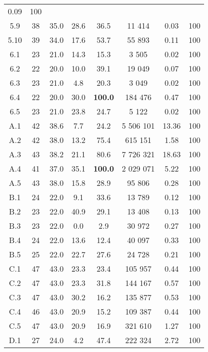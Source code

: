 \begin{longtable}{@{\extracolsep{5pt}}cccccccc}
	0.09
	&
	100
	\\
	5.9
	&
	38
	&
	35.0
	&
	28.6
	&
	36.5
	&
	11 414
	&
	0.03
	&
	100
	\\
	5.10
	&
	39
	&
	34.0
	&
	17.6
	&
	53.7
	&
	55 893
	&
	0.11
	&
	100
	\\
	6.1
	&
	23
	&
	21.0
	&
	14.3
	&
	15.3
	&
	3 505
	&
	0.02
	&
	100
	\\
	6.2
	&
	22
	&
	20.0
	&
	10.0
	&
	39.1
	&
	19 049
	&
	0.07
	&
	100
	\\
	6.3
	&
	23
	&
	21.0
	&
	4.8
	&
	20.3
	&
	3 049
	&
	0.02
	&
	100
	\\
	6.4
	&
	22
	&
	20.0
	&
	30.0
	&
	\textbf{100.0}
	&
	184 476
	&
	0.47
	&
	100
	\\
	6.5
	&
	23
	&
	21.0
	&
	23.8
	&
	24.7
	&
	5 122
	&
	0.02
	&
	100
	\\
	A.1
	&
	42
	&
	38.6
	&
	7.7
	&
	24.2
	&
	5 506 101
	&
	13.36
	&
	100
	\\
	A.2
	&
	42
	&
	38.0
	&
	13.2
	&
	75.4
	&
	615 151
	&
	1.58
	&
	100
	\\
	A.3
	&
	43
	&
	38.2
	&
	21.1
	&
	80.6
	&
	7 726 321
	&
	18.63
	&
	100
	\\
	A.4
	&
	41
	&
	37.0
	&
	35.1
	&
	\textbf{100.0}
	&
	2 029 071
	&
	5.22
	&
	100
	\\
	A.5
	&
	43
	&
	38.0
	&
	15.8
	&
	28.9
	&
	95 806
	&
	0.28
	&
	100
	\\
	B.1
	&
	24
	&
	22.0
	&
	9.1
	&
	33.6
	&
	13 789
	&
	0.12
	&
	100
	\\
	B.2
	&
	23
	&
	22.0
	&
	40.9
	&
	29.1
	&
	13 408
	&
	0.13
	&
	100
	\\
	B.3
	&
	23
	&
	22.0
	&
	0.0
	&
	2.9
	&
	30 972
	&
	0.27
	&
	100
	\\
	B.4
	&
	24
	&
	22.0
	&
	13.6
	&
	12.4
	&
	40 097
	&
	0.33
	&
	100
	\\
	B.5
	&
	25
	&
	22.0
	&
	22.7
	&
	27.6
	&
	24 728
	&
	0.21
	&
	100
	\\
	C.1
	&
	47
	&
	43.0
	&
	23.3
	&
	23.4
	&
	105 957
	&
	0.44
	&
	100
	\\
	C.2
	&
	47
	&
	43.0
	&
	23.3
	&
	31.8
	&
	144 167
	&
	0.57
	&
	100
	\\
	C.3
	&
	47
	&
	43.0
	&
	30.2
	&
	16.2
	&
	135 877
	&
	0.53
	&
	100
	\\
	C.4
	&
	46
	&
	43.0
	&
	20.9
	&
	15.2
	&
	109 387
	&
	0.44
	&
	100
	\\
	C.5
	&
	47
	&
	43.0
	&
	20.9
	&
	16.9
	&
	321 610
	&
	1.27
	&
	100
	\\
	D.1
	&
	27
	&
	24.0
	&
	4.2
	&
	47.4
	&
	222 324
	&
	2.72
	&
	100
	\\

\end{longtable}
